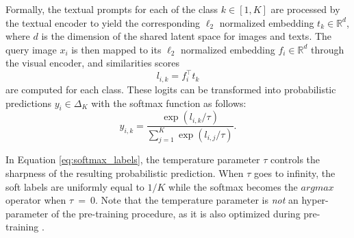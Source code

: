 Formally, the textual prompts for each of the class $k\in [1,K]$ are processed by the textual encoder to yield the corresponding $\ell_2$ normalized embedding $t_k \in \mathbb{R}^d$, where $d$ is the dimension of the shared latent space for images and texts. The query image $x_i$ is then mapped to its $\ell_2$ normalized embedding $f_i \in \mathbb{R}^d$ through the visual encoder, and similarities scores 
\begin{equation}
l_{i,k} = f_i^\top t_k
\end{equation}
are computed for each class. These logits can be transformed into probabilistic predictions $y_i \in \Delta_K$ with the softmax function as follows:
\begin{equation}
y_{i,k}= \frac{\exp (l_{i,k}/\tau)}{\sum_{j=1}^K \exp (l_{i,j}/\tau)}.
\label{eq:softmax_labels}
\end{equation}

In Equation \ref{eq:softmax_labels}, the temperature parameter $\tau$ controls the sharpness of the resulting probabilistic prediction. When $\tau$ goes to infinity, the soft labels are uniformly equal to $1/K$ while the softmax becomes the $arg max $ operator when $\tau~=~0$. Note that the temperature parameter is \textit{not} an hyper-parameter of the pre-training procedure, as it is also optimized during pre-training \cite{radford_learning_2021}.